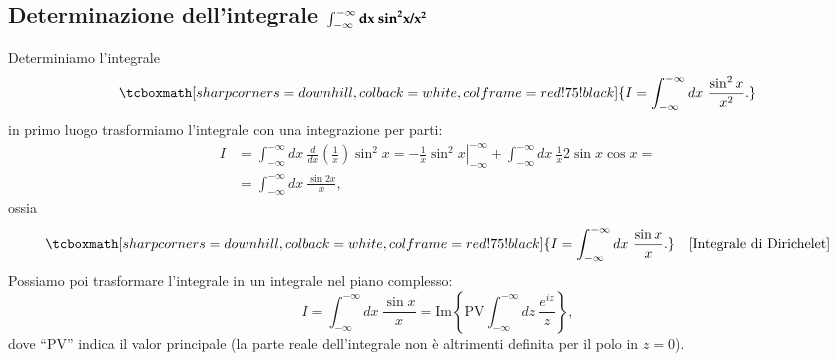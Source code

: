 \documentclass[a4paper,12pt,oneside]{book}
\newcommand*{\myfont}{\fontfamily{ppl}\selectfont}
\begin{document}
\subsection{Determinazione dell'integrale $\int _{-\infty} ^{-\infty} \myfont{\textbf{dx}}\ \myfont{\textbf{sin}} ^{\myfont{\textbf{2}}} \myfont{\textbf{x/}}\myfont{\textbf{x}}^{\myfont{\textbf{2}}}$}
Determiniamo l'integrale
	\begin{equation}
		\tcboxmath[sharp corners=downhill, colback=white, colframe=red!75!black]{
			I= \int _{-\infty} ^{-\infty} dx\ \frac{\sin ^2 x}{x^2}.
			}
	\end{equation}
in primo luogo trasformiamo l'integrale con una integrazione per parti:
	\begin{align}
		I &= \int _{-\infty} ^{-\infty} dx\ \frac{d}{dx}\left(\frac{1}{x}\right)\sin ^2 x =  \left. -\frac{1}{x}\sin ^2 x\right\vert _{-\infty} ^{-\infty} +\int _{-\infty} ^{-\infty} dx\ \frac{1}{x} 2 \sin x \cos x  =\nonumber \\
		&= \int _{-\infty} ^{-\infty} dx\ \frac{\sin 2 x}{x}, 
	\end{align}
ossia
	\begin{equation}
		\tcboxmath[sharp corners=downhill, colback=white, colframe=red!75!black]{
		I= \int _{-\infty} ^{-\infty} dx\ \frac{\sin  x}{x}.
		} \quad \textrm{[Integrale di Dirichelet]}
	\end{equation}
Possiamo poi trasformare l'integrale in un integrale nel piano complesso:
	\begin{equation}
		I= \int _{-\infty} ^{-\infty} dx\ \frac{\sin  x}{x}= \textrm{Im}\left\{\textrm{PV} \int _{-\infty} ^{-\infty} dz\ \frac{e^{iz}}{z}\right\},
	\label{eq:cap15_14}
	\end{equation}
dove ``PV'' indica il valor principale (la parte reale dell'integrale non è altrimenti definita per il polo in $z=0$). \newpage
\end{document}
